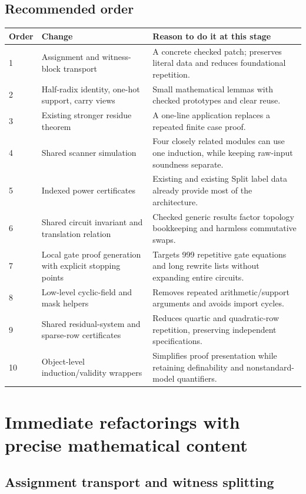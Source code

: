 \documentclass[11pt,letterpaper]{article}
\newcommand{\code}[1]{\texttt{\detokenize{#1}}}
\begin{document}
\subsection{Recommended order}

\begin{longtable}{L{0.06\textwidth}L{0.30\textwidth}L{0.51\textwidth}}
\toprule
Order & Change & Reason to do it at this stage\\
\midrule
{} & Assignment and witness-block transport & A concrete checked patch; preserves literal data and reduces foundational repetition.\\
2 & Half-radix identity, one-hot support, carry views & Small mathematical lemmas with checked prototypes and clear reuse.\\
3 & Existing stronger residue theorem & A one-line application replaces a repeated finite case proof.\\
4 & Shared scanner simulation & Four closely related modules can use one induction, while keeping raw-input soundness separate.\\
5 & Indexed power certificates & Existing \code{run_power} and existing Split label data already provide most of the architecture.\\
6 & Shared circuit invariant and translation relation & Checked generic results factor topology bookkeeping and harmless commutative swaps.\\
7 & Local gate proof generation with explicit stopping points & Targets 999 repetitive gate equations and long rewrite lists without expanding entire circuits.\\
8 & Low-level cyclic-field and mask helpers & Removes repeated arithmetic/support arguments and avoids import cycles.\\
9 & Shared residual-system and sparse-row certificates & Reduces quartic and quadratic-row repetition, preserving independent specifications.\\
10 & Object-level induction/validity wrappers & Simplifies proof presentation while retaining definability and nonstandard-model quantifiers.\\
\bottomrule
\end{longtable}

\section{Immediate refactorings with precise mathematical content}

\subsection{Assignment transport and witness splitting}
\end{document}
